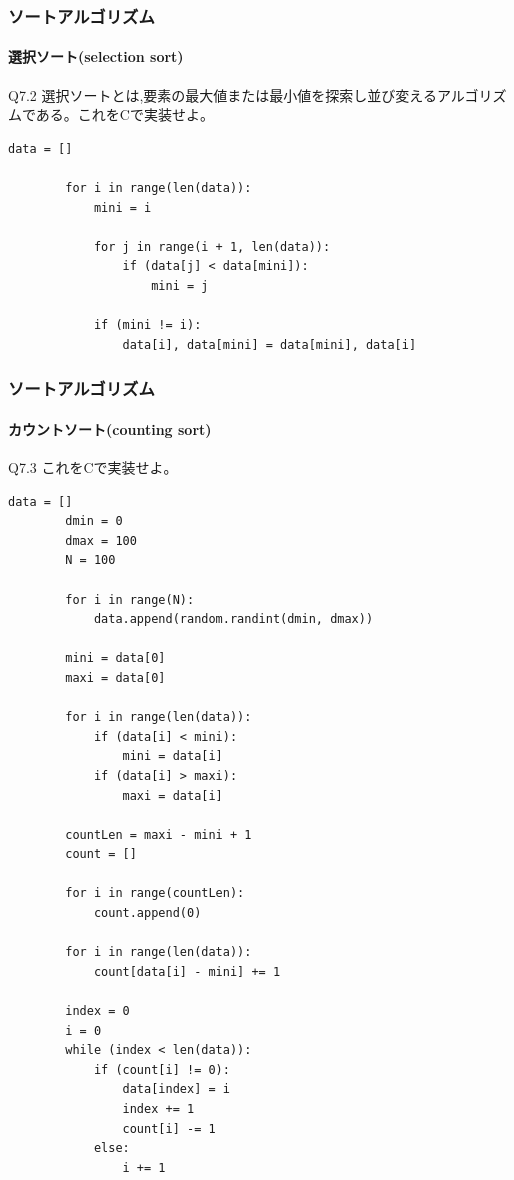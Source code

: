 \documentclass[dvipdfmx]{beamer}
\begin{document}
\begin{frame}[t, fragile]
    \frametitle{ソートアルゴリズム}
    \framesubtitle{選択ソート(selection sort)}
    \begin{itembox}[l]{Q7.2}
        選択ソートとは,要素の最大値または最小値を探索し並び変えるアルゴリズムである。これをCで実装せよ。
    \end{itembox}
    \begin{lstlisting}[gobble=8, caption=selectionSort.py, label=selectionSort]
        data = []

        for i in range(len(data)):
            mini = i

            for j in range(i + 1, len(data)):
                if (data[j] < data[mini]):
                    mini = j

            if (mini != i):
                data[i], data[mini] = data[mini], data[i]
    \end{lstlisting}
\end{frame}

\begin{frame}
    \frametitle{ソートアルゴリズム}
    \framesubtitle{カウントソート(counting sort)}
    \begin{itembox}[l]{Q7.3}
        これをCで実装せよ。
    \end{itembox}
    \begin{lstlisting}[gobble=8, caption=countingSort.py, label=countingSort]
        data = []
        dmin = 0
        dmax = 100
        N = 100

        for i in range(N):
            data.append(random.randint(dmin, dmax))

        mini = data[0]
        maxi = data[0]

        for i in range(len(data)):
            if (data[i] < mini):
                mini = data[i]
            if (data[i] > maxi):
                maxi = data[i]

        countLen = maxi - mini + 1
        count = []

        for i in range(countLen):
            count.append(0)

        for i in range(len(data)):
            count[data[i] - mini] += 1

        index = 0
        i = 0
        while (index < len(data)):
            if (count[i] != 0):
                data[index] = i
                index += 1
                count[i] -= 1
            else:
                i += 1
    \end{lstlisting}
\end{frame}
\end{document}

